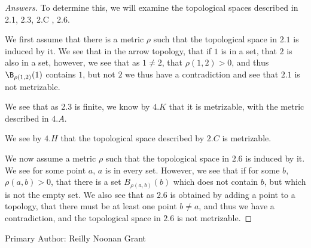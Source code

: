 \begin{proof}[Answers]
  To determine this, we will examine the topological spaces described
  in 2.1, 2.3, 2.C , 2.6.

  We first assume that there is a metric $\rho$ such that the
  topological space in $2.1$ is induced by it. We see that in the
  arrow topology, that if $1$ is in a set, that $2$ is also in a set,
  however, we see that as $1\neq 2$, that $\rho(1,2)>0$, and thus
  $\B_{\rho(1,2)}(1)$ contains $1$, but not $2$ we thus have a
  contradiction and see that $2.1$ is not metrizable.

  We see that as 2.3 is finite, we know by $4.K$ that it is
  metrizable, with the metric described in $4.A$.

  We see by $4.H$ that the topological space described by $2.C$ is
  metrizable.

  We now assume a metric $\rho$ such that the
  topological space in $2.6$ is induced by it. We see for some point
  $a$, $a$ is in every set. However, we see that if for some $b$,
  $\rho(a,b)>0$, that there is a set $B_{\rho(a,b)}(b)$ which does not
  contain $b$, but which is not the empty set. We also see that as
  $2.6$ is obtained by adding  a point to a topology, that there must
  be at least one point $b \neq a$, and thus we have a contradiction,
  and the topological space in $2.6$ is not metrizable.
\end{proof}
Primary Author: Reilly Noonan Grant